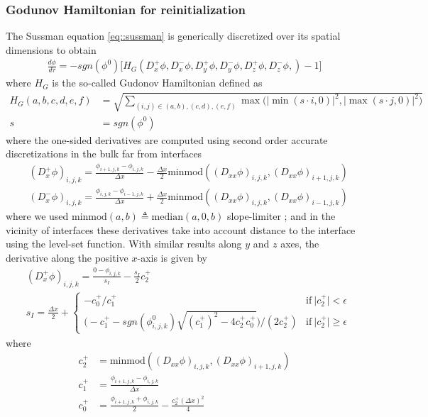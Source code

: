 \documentclass{elsarticle}
\begin{document}
\subsubsection{Godunov Hamiltonian for reinitialization}
The Sussman equation \ref{eq::sussman} is generically discretized over its spatial dimensions to obtain
\begin{align}
	\frac{d\phi}{d\tau} = -sgn(\phi^0) \bigg[ H_G(D_x^+\phi, D_x^-\phi, D_y^+\phi, D_y^-\phi, D_z^+\phi, D_z^-\phi, ) - 1 \bigg]
\end{align}
where $H_G$ is the so-called Gudonov Hamiltonian defined as
\begin{align*}
	H_G(a,b,c,d,e,f) &= \sqrt{ \sum_{(i,j)\in (a,b),(c,d),(e,f)}\max\bigg( \vert\min( s\cdot i,0)\vert^2, \vert\max( s\cdot j,0)\vert^2 \bigg)  }\\
	s&= sgn(\phi^0)
\end{align*}
where the one-sided derivatives are computed using second order accurate discretizations in the bulk far from interfaces
\begin{align*}
	&(D_x^+\phi)_{i,j,k} = \frac{\phi_{i+1,j,k} - \phi_{i,j,k}}{\Delta x} - \frac{\Delta x}{2} \textrm{minmod}((D_{xx}\phi)_{i,j,k}, (D_{xx}\phi)_{i+1,j,k})\\
	&(D_x^-\phi)_{i,j,k} = \frac{\phi_{i,j,k} - \phi_{i-1,j,k}}{\Delta x} + \frac{\Delta x}{2} \textrm{minmod}((D_{xx}\phi)_{i,j,k}, (D_{xx}\phi)_{i-1,j,k})
\end{align*}
where we used $\textrm{minmod}(a,b)\triangleq \textrm{median}(a,0,b)$ slope-limiter \cite{shu1988efficient}; and in the vicinity of interfaces these derivatives take into account distance to the interface using the level-set function. With similar results along $y$ and $z$ axes, the derivative along the positive $x$-axis is given by 
\begin{align*}
 &(D_x^+\phi)_{i,j,k} = \frac{0 - \phi_{i,j,k}}{s_I} - \frac{s_I}{2} c_2^+\\
 & s_I = \frac{\Delta x}{2} + \left\{
 \begin{array}{ll}
 	-c_0^+/c_1^+    & \textrm{if} \ \vert c_2^+\vert<\epsilon \\
 	\bigg(-c_1^+ - sgn(\phi^0_{i,j,k})\sqrt{(c_1^+)^2 - 4c_2^+ c_0^+} \bigg)/(2 c_2^+)    & \textrm{if} \ \vert c_2^+\vert\ge \epsilon 
 \end{array}
\right.
\end{align*}
where 
\begin{align*}
	c_2^+ &= \textrm{minmod}((D_{xx}\phi)_{i,j,k}, (D_{xx}\phi)_{i+1,j,k}) \\
	c_1^+ &=  \frac{\phi_{i+1,j,k} - \phi_{i,j,k}}{\Delta x} \\
	c_0^+ &= \frac{\phi_{i+1,j,k} + \phi_{i,j,k}}{2} - \frac{c_2^+ (\Delta x)^2}{4}
\end{align*}
\end{document}
